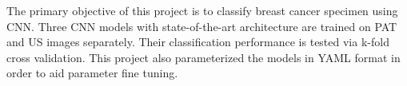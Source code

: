 The primary objective of this project is to classify breast cancer specimen using CNN. Three CNN models with state-of-the-art architecture are trained on PAT and US images separately. Their classification performance is tested via k-fold cross validation. This project also parameterized the models in YAML format in order to aid parameter fine tuning.





